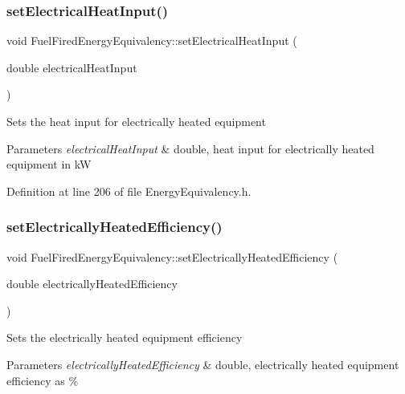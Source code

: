 \subsubsection{\texorpdfstring{set\+Electrical\+Heat\+Input()}{setElectricalHeatInput()}}
{\footnotesize\ttfamily void Fuel\+Fired\+Energy\+Equivalency\+::set\+Electrical\+Heat\+Input (\begin{DoxyParamCaption}\item[{double}]{electrical\+Heat\+Input }\end{DoxyParamCaption})\hspace{0.3cm}{\ttfamily [inline]}}

Sets the heat input for electrically heated equipment


\begin{DoxyParams}{Parameters}
{\em electrical\+Heat\+Input} & double, heat input for electrically heated equipment in kW \\
\hline
\end{DoxyParams}


Definition at line 206 of file Energy\+Equivalency.\+h.

\mbox{\label{class_fuel_fired_energy_equivalency_a2e8e166d9824ee07805cd790eff5e361}} 
\subsubsection{\texorpdfstring{set\+Electrically\+Heated\+Efficiency()}{setElectricallyHeatedEfficiency()}}
{\footnotesize\ttfamily void Fuel\+Fired\+Energy\+Equivalency\+::set\+Electrically\+Heated\+Efficiency (\begin{DoxyParamCaption}\item[{double}]{electrically\+Heated\+Efficiency }\end{DoxyParamCaption})\hspace{0.3cm}{\ttfamily [inline]}}

Sets the electrically heated equipment efficiency


\begin{DoxyParams}{Parameters}
{\em electrically\+Heated\+Efficiency} & double, electrically heated equipment efficiency as \% \\
\hline
\end{DoxyParams}


